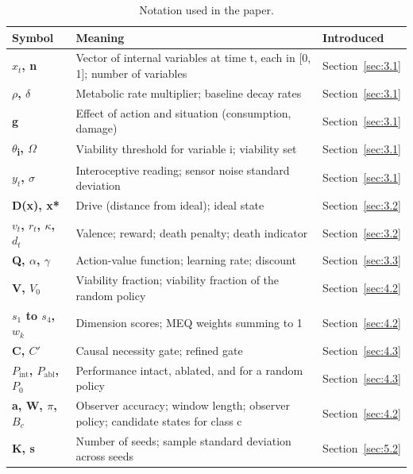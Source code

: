 \documentclass[twoside,11pt]{article}
\begin{document}
\begin{table}[H]
\centering
\caption{Notation used in the paper.}\label{tab:11}
\small
\renewcommand{\arraystretch}{1.2}
\begin{tabular}{>{\raggedright\arraybackslash}p{\dimexpr 0.1883\dimexpr\textwidth-6\tabcolsep\relax\relax}>{\raggedright\arraybackslash}p{\dimexpr 0.5872\dimexpr\textwidth-6\tabcolsep\relax\relax}>{\raggedright\arraybackslash}p{\dimexpr 0.2245\dimexpr\textwidth-6\tabcolsep\relax\relax}}
\toprule
\textbf{Symbol} & \textbf{Meaning} & \textbf{Introduced} \\
\midrule
\textbf{$x_{t}$, n} & Vector of internal variables at time t, each in {[}0, 1{]}; number of variables & Section~\ref{sec:3.1} \\
\textbf{\ensuremath{\rho}, \ensuremath{\delta}} & Metabolic rate multiplier; baseline decay rates & Section~\ref{sec:3.1} \\
\textbf{g} & Effect of action and situation (consumption, damage) & Section~\ref{sec:3.1} \\
\textbf{\ensuremath{\theta}\textsubscript{i}, \ensuremath{\Omega}} & Viability threshold for variable i; viability set & Section~\ref{sec:3.1} \\
\textbf{$y_{t}$, \ensuremath{\sigma}} & Interoceptive reading; sensor noise standard deviation & Section~\ref{sec:3.1} \\
\textbf{D(x), x*} & Drive (distance from ideal); ideal state & Section~\ref{sec:3.2} \\
\textbf{$v_{t}$, $r_{t}$, \ensuremath{\kappa}, $d_{t}$} & Valence; reward; death penalty; death indicator & Section~\ref{sec:3.2} \\
\textbf{Q, \ensuremath{\alpha}, \ensuremath{\gamma}} & Action-value function; learning rate; discount & Section~\ref{sec:3.3} \\
\textbf{V, $V_{0}$} & Viability fraction; viability fraction of the random policy & Section~\ref{sec:4.2} \\
\textbf{$s_{1}$ to $s_{4}$, $w_{k}$} & Dimension scores; MEQ weights summing to 1 & Section~\ref{sec:4.2} \\
\textbf{C, $C'$} & Causal necessity gate; refined gate & Section~\ref{sec:4.3} \\
\textbf{$P_{\mathrm{int}}$, $P_{\mathrm{abl}}$, $P_{0}$} & Performance intact, ablated, and for a random policy & Section~\ref{sec:4.3} \\
\textbf{a, W, \ensuremath{\pi}, $B_{c}$} & Observer accuracy; window length; observer policy; candidate states for class c & Section~\ref{sec:4.2} \\
\textbf{K, s} & Number of seeds; sample standard deviation across seeds & Section~\ref{sec:5.2} \\
\bottomrule
\end{tabular}
\end{table}
\end{document}
